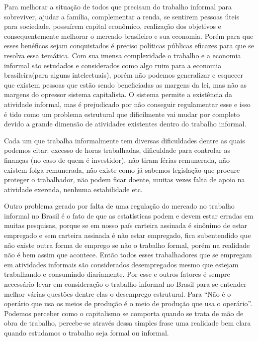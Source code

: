 Para melhorar a situação de todos que precisam do trabalho informal para sobreviver, ajudar a família, complementar a renda, se sentirem pessoas úteis para sociedade, possuírem capital econômico, realização dos objetivos e consequentemente melhorar o mercado brasileiro e sua economia. Porém para que esses benéficos sejam conquistados é preciso políticas públicas eficazes para que se resolva essa temática.
Com sua imensa complexidade o trabalho e a economia informal são estudados e considerados como algo ruim para a economia brasileira(para alguns intelectuais), porém não podemos generalizar e esquecer que existem pessoas que estão sendo beneficiadas as margens da lei, mas não as margens do opressor sistema capitalista. O sistema permite a existência da atividade informal, mas é prejudicado por não conseguir regulamentar esse e isso é tido como um problema estrutural que dificilmente vai mudar por completo devido a grande dimensão de atividades existentes dentro do trabalho informal.

Cada um que trabalha informalmente tem diversas dificuldades dentre as quais podemos citar: excesso de horas trabalhadas, dificuldade para controlar as finanças (no caso de quem é investidor), não tiram férias remunerada, não existem folga remunerada, não existe como já sabemos legislação que procure proteger o trabalhador, não podem ficar doente, muitas vezes falta de apoio na atividade exercida, nenhuma estabilidade etc.

Outro problema gerado por falta de uma regulação do mercado no trabalho informal no Brasil é o fato de que as estatísticas podem e devem estar erradas em muitas pesquisas, porque se em nosso país carteira assinada é sinônimo de estar empregado e sem carteira assinada é não estar empregado, fica subentendido que não existe outra forma de emprego se não o trabalho formal, porém na realidade não é bem assim que acontece. Então todos esses trabalhadores que se empregam em atividades informais são considerados desempregados mesmo que estejam trabalhando e consumindo diariamente. Por esse e outros fatores é sempre necessário levar em consideração o trabalho informal no Brasil para se entender melhor várias questões dentre elas o desemprego estrutural.
Para \cite{augusta} ``Não é o operário que usa os meios de produção é o meio de produção que usa o operário''. Podemos perceber como o capitalismo se comporta quando se trata de mão de obra de trabalho, percebe-se através dessa simples frase uma realidade bem clara quando estudamos o trabalho seja formal ou informal.


